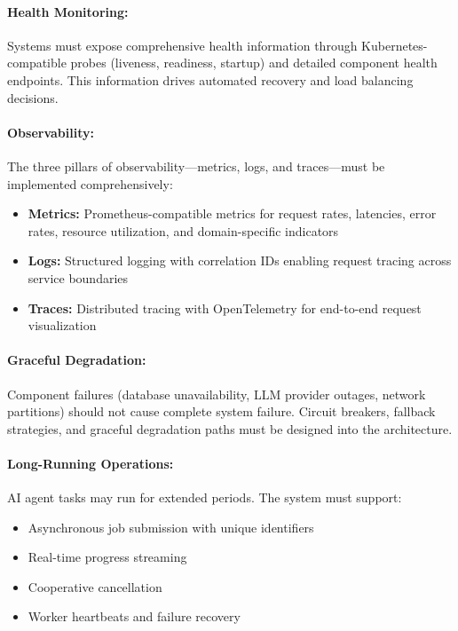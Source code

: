 \documentclass[a4paper,twoside]{sapthesis}
\begin{document}
\paragraph{Health Monitoring:}
Systems must expose comprehensive health information through Kubernetes-compatible probes (liveness, readiness, startup) and detailed component health endpoints. This information drives automated recovery and load balancing decisions.

\paragraph{Observability:}
The three pillars of observability---metrics, logs, and traces---must be implemented comprehensively:
\begin{itemize}
    \item \textbf{Metrics:} Prometheus-compatible metrics for request rates, latencies, error rates, resource utilization, and domain-specific indicators
    \item \textbf{Logs:} Structured logging with correlation IDs enabling request tracing across service boundaries
    \item \textbf{Traces:} Distributed tracing with OpenTelemetry for end-to-end request visualization
\end{itemize}

\paragraph{Graceful Degradation:}
Component failures (database unavailability, LLM provider outages, network partitions) should not cause complete system failure. Circuit breakers, fallback strategies, and graceful degradation paths must be designed into the architecture.

\paragraph{Long-Running Operations:}
AI agent tasks may run for extended periods. The system must support:
\begin{itemize}
    \item Asynchronous job submission with unique identifiers
    \item Real-time progress streaming
    \item Cooperative cancellation
    \item Worker heartbeats and failure recovery
\end{itemize}
\end{document}
